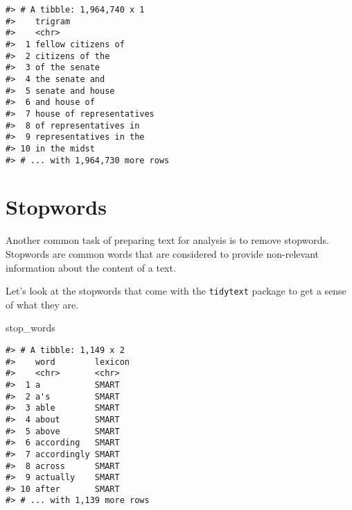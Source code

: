 \documentclass[]{book}
\newenvironment{Shaded}{\begin{snugshade}}{\end{snugshade}}
\newcommand{\CommentTok}[1]{\textcolor[rgb]{0.56,0.35,0.01}{\textit{#1}}}
\newcommand{\DataTypeTok}[1]{\textcolor[rgb]{0.13,0.29,0.53}{#1}}
\newcommand{\DecValTok}[1]{\textcolor[rgb]{0.00,0.00,0.81}{#1}}
\newcommand{\KeywordTok}[1]{\textcolor[rgb]{0.13,0.29,0.53}{\textbf{#1}}}
\newcommand{\NormalTok}[1]{#1}
\newcommand{\OperatorTok}[1]{\textcolor[rgb]{0.81,0.36,0.00}{\textbf{#1}}}
\newcommand{\StringTok}[1]{\textcolor[rgb]{0.31,0.60,0.02}{#1}}
\begin{document}
\begin{Shaded}
\end{Shaded}

\begin{verbatim}
#> # A tibble: 1,964,740 x 1
#>    trigram                 
#>    <chr>                   
#>  1 fellow citizens of      
#>  2 citizens of the         
#>  3 of the senate           
#>  4 the senate and          
#>  5 senate and house        
#>  6 and house of            
#>  7 house of representatives
#>  8 of representatives in   
#>  9 representatives in the  
#> 10 in the midst            
#> # ... with 1,964,730 more rows
\end{verbatim}

\hypertarget{stopwords}{%
\section{Stopwords}\label{stopwords}}

Another common task of preparing text for analysis is to remove stopwords. Stopwords are common words that are considered to provide non-relevant information about the content of a text.

Let's look at the stopwords that come with the \texttt{tidytext} package to get a sense of what they are.

\begin{Shaded}
\begin{Highlighting}[]
\NormalTok{stop_words}
\end{Highlighting}
\end{Shaded}

\begin{verbatim}
#> # A tibble: 1,149 x 2
#>    word        lexicon
#>    <chr>       <chr>  
#>  1 a           SMART  
#>  2 a's         SMART  
#>  3 able        SMART  
#>  4 about       SMART  
#>  5 above       SMART  
#>  6 according   SMART  
#>  7 accordingly SMART  
#>  8 across      SMART  
#>  9 actually    SMART  
#> 10 after       SMART  
#> # ... with 1,139 more rows
\end{verbatim}
\end{document}
